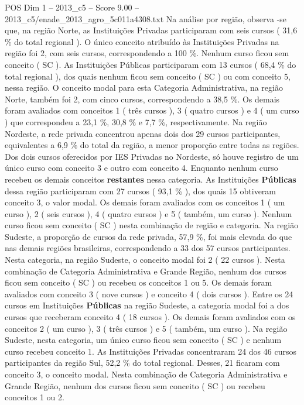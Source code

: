 \begin{textsample}{POS Dim 1 – 2013\_c5 – Score 9.00 – 2013\_c5/enade\_2013\_agro\_5c011a4308.txt}
Na análise por região, observa -se que, na região Norte, as Instituições Privadas participaram com seis cursos ( 31,6 \% do total regional ).
O único conceito atribuído às Instituições Privadas na região foi 2, com seis cursos, correspondendo a 100 \%.
Nenhum curso ficou sem conceito ( SC ).
As Instituições Públicas participaram com 13 cursos ( 68,4 \% do total regional ), dos quais nenhum ficou sem conceito ( SC ) ou com conceito 5, nessa região.
O conceito modal para esta Categoria Administrativa, na região Norte, também foi 2, com cinco cursos, correspondendo a 38,5 \%.
Os demais foram avaliados com conceitos 1 ( três cursos ), 3 ( quatro cursos ) e 4 ( um curso ) que correspondeu a 23,1 \%, 30,8 \% e 7,7 \%, respectivamente.
Na região Nordeste, a rede privada concentrou apenas dois dos 29 cursos participantes, equivalentes a 6,9 \% do total da região, a menor proporção entre todas as regiões.
Dos dois cursos oferecidos por IES Privadas no Nordeste, só houve registro de um único curso com conceito 3 e outro com conceito 4.
Enquanto nenhum curso recebeu os demais conceitos \textbf{restantes} nessa categoria.
As Instituições \textbf{Públicas} dessa região participaram com 27 cursos ( 93,1 \% ), dos quais 15 obtiveram conceito 3, o valor modal.
Os demais foram avaliados com os conceitos 1 ( um curso ), 2 ( seis cursos ), 4 ( quatro cursos ) e 5 ( também, um curso ).
Nenhum curso ficou sem conceito ( SC ) nesta combinação de região e categoria.
Na região Sudeste, a proporção de cursos da rede privada, 57,9 \%, foi mais elevada do que nas demais regiões brasileiras, correspondendo a 33 dos 57 cursos participantes.
Nesta categoria, na região Sudeste, o conceito modal foi 2 ( 22 cursos ).
Nesta combinação de Categoria Administrativa e Grande Região, nenhum dos cursos ficou sem conceito ( SC ) ou recebeu os conceitos 1 ou 5.
Os demais foram avaliados com conceito 3 ( nove cursos ) e conceito 4 ( dois cursos ).
Entre os 24 cursos em Instituições \textbf{Públicas} na região Sudeste, a categoria modal foi a dos cursos que receberam conceito 4 ( 18 cursos ).
Os demais foram avaliados com os conceitos 2 ( um curso ), 3 ( três cursos ) e 5 ( também, um curso ).
Na região Sudeste, nesta categoria, um único curso ficou sem conceito ( SC ) e nenhum curso recebeu conceito 1.
As Instituições Privadas concentraram 24 dos 46 cursos participantes da região Sul, 52,2 \% do total regional.
Desses, 21 ficaram com conceito 3, o conceito modal.
Nesta combinação de Categoria Administrativa e Grande Região, nenhum dos cursos ficou sem conceito ( SC ) ou recebeu conceitos 1 ou 2.

\end{textsample}
